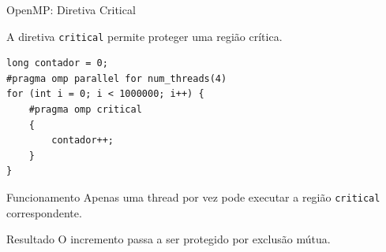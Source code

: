 \documentclass[aspectratio=169,11pt]{beamer}
\begin{document}

\begin{frame}[fragile]{OpenMP: Diretiva Critical}

A diretiva \texttt{critical} permite proteger
uma região crítica.

\small
\begin{verbatim}
long contador = 0;
#pragma omp parallel for num_threads(4)
for (int i = 0; i < 1000000; i++) {
    #pragma omp critical
    {
        contador++;
    }
}
\end{verbatim}

\vspace{0.3cm}

\begin{block}{Funcionamento}
Apenas uma thread por vez pode executar
a região \texttt{critical} correspondente.
\end{block}

\begin{alertblock}{Resultado}
O incremento passa a ser protegido por
exclusão mútua.
\end{alertblock}

\end{frame}


\end{document}
